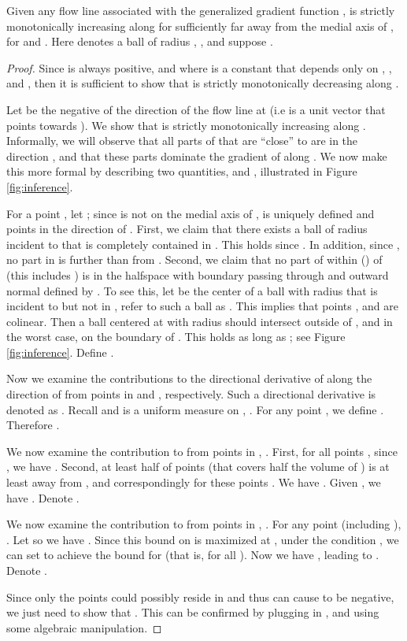 \documentclass[11pt]{myclass}
\begin{document}
\begin{lemma}
Given any flow line  associated with the generalized gradient function ,  is strictly monotonically increasing along  for  sufficiently far away from the medial axis of , for  and . 
Here  denotes a ball of radius ,  ,  and suppose .  
\label{lem:monotonicity-app}
\end{lemma}
\begin{proof}
Since  is always positive, and  where  is a constant that depends only on , , and , then it is sufficient to show that  is strictly monotonically decreasing along .  

Let  be the negative of the direction of the flow line  at  (i.e  is a unit vector that points towards ). We show that  is strictly monotonically increasing along . 
Informally, we will observe that all parts of  that are ``close'' to  are in the direction , and that these parts dominate the gradient of  along .  
We now make this more formal by describing two quantities,  and , illustrated in Figure \ref{fig:inference}.  

For a point , let ; since  is not on the medial axis of ,  is uniquely defined and  points in the direction of . 
First, we claim that there exists a ball  of radius  incident to  that is completely contained in .
This holds since . 
In addition, since , no part in  is further than  from .
Second, we claim that no part of  within  ()  of  (this includes ) is in the halfspace  with boundary passing through  and outward normal defined by .  
To see this, let  be the center of a ball with radius  that is incident to  but not in , refer to such a ball as . This implies that points ,  and  are colinear. Then a ball centered at  with radius  should intersect  outside of , and in the worst case, on the boundary of . 
This holds as long as ; see Figure \ref{fig:inference}.  
Define .    


Now we examine the contributions to the directional derivative of  along the direction of  from points in  and , respectively. 
Such a directional derivative is denoted as . 
Recall  and  is a uniform measure on , . 
For any point , we define  
. 
Therefore . 

We now examine the contribution to  from points in , 
.  First, for all points , since , we have . 
Second, at least half of points  (that covers half the volume of ) is at least  away from , and correspondingly for these points . 
We have . Given , we have .   
Denote . 

We now examine the contribution to  from points in , 
. For any point  (including ), 
. 
Let  so we have . 
Since this bound on  is maximized at , under the condition , we can set  to achieve the bound  for  (that is, for all ).  
Now we have , leading to . Denote . 

Since only the points  could possibly reside in  and thus can cause  to be negative, we just need to show that .  
This can be confirmed by plugging in , and using some algebraic manipulation.  
\end{proof}
\end{document}
